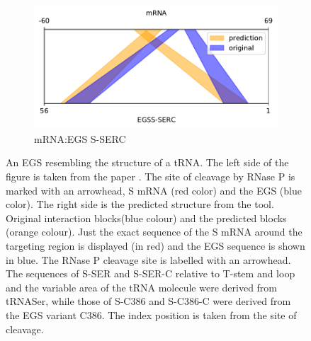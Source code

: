 \documentclass[twoside,a4paper]{report}
\numberwithin{equation}{section}
\begin{document}
\begin{figure}[h!tb]
\begin{subfigure}{.25\textwidth}
	 		\label{fig:SERC}
	 	\end{subfigure}%
 	\begin{subfigure}{.5\textwidth}
 		\centering
 		\includegraphics[width=.9\linewidth]{rricomparison8}
 		\caption{mRNA:EGS S-SERC}
 		\label{fig:rricomparison8}
 	\end{subfigure}
 	\caption{An EGS resembling the structure of a tRNA. The left side of the figure is taken from the paper \citep {zhang2013engineered}. The site of cleavage by RNase P is marked with an arrowhead, S mRNA (red color) and the EGS (blue color). The right side is the predicted structure from the tool. Original interaction blocks(blue colour) and the predicted blocks (orange colour). Just the exact sequence of the S mRNA around the targeting region is displayed (in red) and the EGS sequence is shown in blue. The RNase P cleavage site is labelled with an arrowhead. The sequences of S-SER and S-SER-C relative to T-stem and loop and the variable area of the tRNA molecule were derived from tRNASer, while those of S-C386 and S-C386-C were derived from the EGS variant C386. The index position is taken from the site of cleavage.\\ }
	 	\label{fig:test1}
	 \end{figure}
	 
\clearpage	
\end{document}
